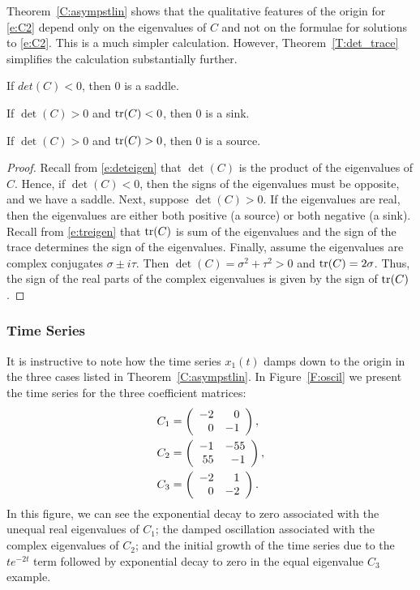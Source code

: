 \documentclass{ximera}
\begin{document}
Theorem~\ref{C:asympstlin} shows that the qualitative features of the 
origin for \eqref{e:C2} depend only on the eigenvalues of $C$ and not
on the formulae for solutions to \eqref{e:C2}.  This is a much simpler 
calculation.  However, Theorem~\ref{T:det_trace} simplifies the calculation 
substantially further.

\begin{theorem} \label{T:det_trace}
\begin{enumeratea}
\item If $det(C) < 0$, then $0$ is a saddle.
\item If $\det(C) > 0$ and ${\rm tr}(C) < 0$, then $0$ is a sink.
\item If $\det(C) > 0$ and ${\rm tr}(C) > 0$, then $0$ is a source.
\end{enumeratea}
\end{theorem}

\begin{proof}
Recall from \eqref{e:deteigen} that $\det(C)$ is the product 
of the eigenvalues of $C$. Hence, if $\det(C) < 0$, then the signs of the 
eigenvalues must be opposite, and we have a saddle.  Next, suppose 
$\det(C) > 0$.  If the eigenvalues are real, then the eigenvalues are either 
both positive (a source) or both negative (a sink).  Recall from \eqref{e:treigen} 
that ${\rm tr}(C)$ is sum of the eigenvalues and the sign of the trace 
determines the sign of the eigenvalues. Finally, assume the eigenvalues 
are complex conjugates $\sigma\pm i\tau$.  Then $\det(C) = \sigma^2+\tau^2 > 0$
and ${\rm tr}(C) = 2\sigma$.  Thus, the sign of the real parts of the complex eigenvalues 
is given by the sign of ${\rm tr}(C)$. 
\end{proof}

\subsubsection*{Time Series}

It is instructive to note how the time series $x_1(t)$ damps down to the
origin in the three cases listed in Theorem~\ref{C:asympstlin}.
In Figure~\ref{F:oscil} we present the time series for the three
coefficient matrices:
\begin{align*}
C_1 &= \left(\begin{array}{rr} -2 & 0\\ 0 &-1\end{array}\right), \\
C_2 &= \left(\begin{array}{rr} -1 & -55\\ 55 &-1\end{array}\right), \\
C_3 &= \left(\begin{array}{rr} -2 & 1\\ 0 &-2\end{array}\right).
\end{align*}
In this figure, we can see the exponential decay to zero associated with the
unequal real eigenvalues of $C_1$; the damped oscillation associated with the
complex eigenvalues of $C_2$; and the initial growth of the time series due
to the $te^{-2t}$ term followed by exponential decay to zero in the equal
eigenvalue $C_3$ example.
\end{document}
